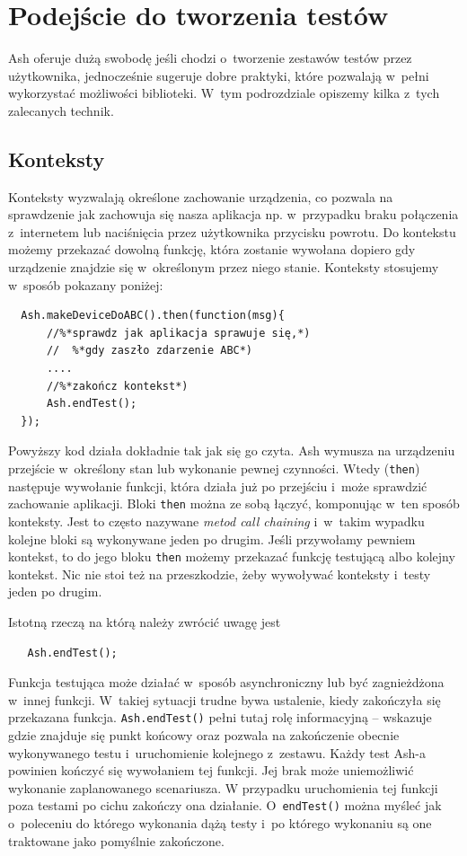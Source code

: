 \documentclass[brudnopis]{xmgr}
\begin{document}
\section{Podejście do tworzenia testów}

Ash oferuje dużą swobodę jeśli chodzi o~tworzenie zestawów testów przez użytkownika, jednocześnie sugeruje dobre praktyki, które pozwalają w~pełni wykorzystać możliwości biblioteki. W~tym podrozdziale opiszemy kilka z~tych zalecanych technik.    

\subsection{Konteksty}

Konteksty wyzwalają określone zachowanie urządzenia, co pozwala na sprawdzenie jak zachowuja się nasza aplikacja np. w~przypadku braku połączenia z~internetem lub naciśnięcia przez użytkownika przycisku powrotu. Do kontekstu możemy przekazać dowolną funkcję, która zostanie wywołana dopiero gdy urządzenie znajdzie się w~określonym przez niego stanie. Konteksty stosujemy w~sposób pokazany poniżej:

\begin{lstlisting}
  Ash.makeDeviceDoABC().then(function(msg){
      //%*sprawdz jak aplikacja sprawuje się,*) 
      //  %*gdy zaszło zdarzenie ABC*)
      ....
      //%*zakończ kontekst*)
      Ash.endTest();
  });
\end{lstlisting}

Powyższy kod działa dokładnie tak jak się go czyta. Ash wymusza na urządzeniu przejście w~określony stan lub wykonanie pewnej czynności. Wtedy (\texttt{then}) następuje wywołanie funkcji, która działa już po przejściu i~może sprawdzić zachowanie aplikacji. Bloki \texttt{then} można ze sobą łączyć, komponując w~ten sposób konteksty. Jest to często nazywane \textit{metod call chaining} i~w~takim wypadku kolejne bloki są wykonywane jeden po drugim. Jeśli przywołamy pewniem kontekst, to do jego bloku \texttt{then} możemy przekazać funkcję testującą albo kolejny kontekst. Nic nie stoi też na przeszkodzie, żeby wywoływać konteksty i~testy jeden po drugim. 

Istotną rzeczą na którą należy zwrócić uwagę jest 

\begin{lstlisting}
   Ash.endTest();
\end{lstlisting}

Funkcja testująca może działać w~sposób asynchroniczny lub być zagnieżdżona w~innej funkcji. W~takiej sytuacji trudne bywa ustalenie, kiedy zakończyła się przekazana funkcja. \texttt{Ash.endTest()} pełni tutaj rolę informacyjną -- wskazuje gdzie znajduje się punkt końcowy oraz pozwala na zakończenie obecnie wykonywanego testu i~uruchomienie kolejnego z~zestawu. Każdy test Ash-a powinien kończyć się wywołaniem tej funkcji. Jej brak może uniemożliwić wykonanie zaplanowanego scenariusza. W przypadku uruchomienia tej funkcji poza testami po cichu zakończy ona działanie. O~\texttt{endTest()} można myśleć jak o~poleceniu do którego wykonania dążą testy i~po którego wykonaniu są one traktowane jako pomyślnie zakończone. 
\end{document}
